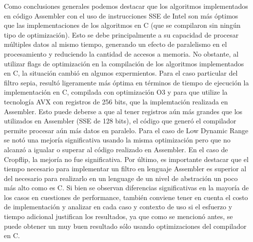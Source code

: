 \documentclass[a4paper]{article}
\begin{document}
Como conclusiones generales podemos destacar que los algoritmos implementados
en código Assembler con el uso de instrucciones SSE de Intel son más óptimos que
las implementaciones de los algoritmos en C (que se compilaron sin ningún
tipo de optimización). Esto se debe principalmente a
su capacidad de procesar múltiples datos al mismo tiempo, generando un efecto
de paralelismo en el procesamiento y reduciendo la cantidad de accesos a memoria.
No obstante, al utilizar flags de optimización en la compilación de los algoritmos
implementados en C, la situación cambió en algunos expermientos. Para el caso particular
del filtro sepia, resultó ligeramente más óptima en términos de tiempo de ejecución
la implementación en C, compilada con optimización O3 y para que utilize la tecnología
AVX con registros de 256 bits, que la implemtación realizada en Assembler. Esto puede deberse
a que al tener registros aún más grandes que los utilizados en Assembler (SSE de 128 bits),
el código que generó el compilador permite procesar aún más datos en paralelo.
Para el caso de Low Dynamic Range se notó una mejoría significativa usando la misma optimización
pero que no alcanzó a igualar o superar al código realizado en Assembler. En el caso de Cropflip, la mejoría no fue significativa.
Por último, es importante destacar que el tiempo necesario para implementar un filtro en lenguaje
Assembler es superior al del necesario para realizarlo en un lenguage de un nivel de abstración
un poco más alto como es C. Si bien se observan diferencias significativas en la mayoría de los
casos en cuestiones de performance, también conviene tener en cuenta el costo de implementación y
analizar en cada caso y contexto de uso si el esfuerzo y tiempo adicional justifican los resultados,
ya que como se mencionó antes, se puede obtener un muy buen resultado sólo usando optimizaciones del compilador en C.
\end{document}
